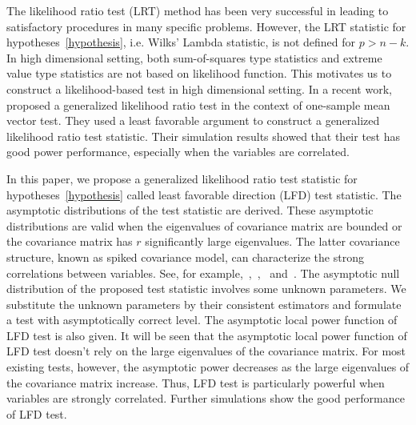 \documentclass[12pt]{article} %
\newcommand{\bfsym}[1]{\ensuremath{\boldsymbol{#1}}}
\def\bSigma {\bfsym {\Sigma}}
\theoremstyle{definition}
\begin{document}
   The likelihood ratio test (LRT) method has been very successful in leading to satisfactory procedures in many specific problems.
    However, the LRT statistic for hypotheses~\eqref{hypothesis}, i.e. Wilks' Lambda statistic, is not defined for $p>n-k$.
   In high dimensional setting, both sum-of-squares type statistics and extreme value type statistics are not based on likelihood function.
    This motivates us to construct a likelihood-based test in high dimensional setting.
    In a recent work,~\cite{Zhao2016A} proposed a generalized likelihood ratio test in the context of one-sample mean vector test.
    They used a least favorable argument to construct a generalized likelihood ratio test statistic.
    Their simulation results showed that their test has good power performance, especially when the variables are correlated.


    In this paper, we propose a generalized likelihood ratio test statistic for hypotheses~\eqref{hypothesis} called least favorable direction (LFD) test statistic.
    The asymptotic distributions of the test statistic are derived.
    These asymptotic distributions are valid when the eigenvalues of covariance matrix are bounded or the covariance matrix has $r$ significantly large eigenvalues.
    The latter covariance structure, known as spiked covariance model, can characterize the strong correlations between variables. See, for example,~\citet{Fan2008High},~\citet{Cai2012Sparse},~\citet{Shen2013Consistency} and~\citet{Ma2015A}.
    The asymptotic null distribution of the proposed test statistic involves some unknown parameters.
    We substitute the unknown parameters by their consistent estimators and formulate a test with asymptotically correct level.
    The asymptotic local power function of LFD test is also given.
 It will be seen that the asymptotic local power function of LFD test doesn't rely on the large eigenvalues of the covariance matrix.
For most existing tests, however, the asymptotic power decreases as the large eigenvalues of the covariance matrix increase.
    Thus, LFD test is particularly powerful when variables are strongly correlated.
    Further simulations show the good performance of LFD test.
\end{document}
